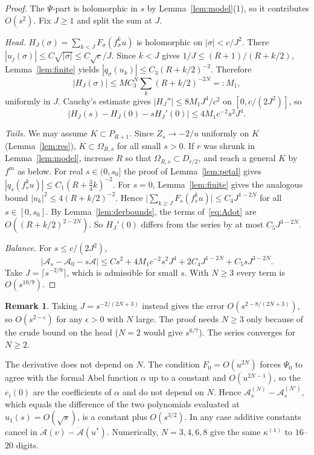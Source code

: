 \documentclass[11pt]{amsart}
\theoremstyle{definition}
\newtheorem{remark}[theorem]{Remark}
\begin{document}
\begin{proof}
The $\Psi$-part is holomorphic in $s$ by Lemma~\ref{lem:model}(1), so it
contributes $O(s^2)$.  Fix $J\ge1$ and split the sum at $J$.

\emph{Head.}  $H_J(\sigma)=\sum_{k<J}F_\sigma(f_\sigma^ku)$ is holomorphic on
$|\sigma|<c/J^2$.  There $|u_j(\sigma)|\le C\sqrt{|\sigma|}\le C\sqrt c/J$.
Since $k<J$ gives $1/J\le(R+1)/(R+k/2)$, Lemma~\ref{lem:finite} yields
$|q_\sigma(u_k)|\le C_3(R+k/2)^{-2}$.  Therefore
\[
 |H_J(\sigma)|\le MC_3^N\sum_k(R+k/2)^{-2N}=:M_1,
\]
uniformly in $J$.  Cauchy's estimate gives $|H_J''|\le8M_1J^4/c^2$ on
$[0,c/(2J^2)]$, so
\[
 |H_J(s)-H_J(0)-sH_J'(0)|\le4M_1c^{-2}s^2J^4 .
\]

\emph{Tails.}  We may assume $K\subset P_{R+1}$.  Since $Z_s\to-2/u$ uniformly
on $K$ (Lemma~\ref{lem:res}), $K\subset\Omega_{R,s}$ for all small $s>0$.  If $r$
was shrunk in Lemma~\ref{lem:model}, increase $R$ so that
$\Omega_{R,s}\subset D_{r/2}$, and reach a general $K$ by $f^m$ as below.  For
real $s\in(0,s_0]$ the proof of Lemma~\ref{lem:petal} gives
$|q_s(f_s^ku)|\le C_1(R+\tfrac34k)^{-2}$.  For $s=0$, Lemma~\ref{lem:finite}
gives the analogous bound $|u_k|^2\le4(R+k/2)^{-2}$.  Hence
$\bigl|\sum_{k\ge J}F_s(f_s^ku)\bigr|\le C_4J^{1-2N}$ for all $s\in[0,s_0]$.
By Lemma~\ref{lem:derbounds}, the terms of~\eqref{eq:Adot} are
$O((R+k/2)^{2-2N})$.  So $H_J'(0)$ differs from the series by at most
$C_5J^{3-2N}$.

\emph{Balance.}  For $s\le c/(2J^2)$,
\[
 \bigl|\mathcal A_s-\mathcal A_0-s\dot{\mathcal A}\bigr|
 \le Cs^2+4M_1c^{-2}s^2J^4+2C_4J^{1-2N}+C_5sJ^{3-2N}.
\]
Take $J=\lceil s^{-2/9}\rceil$, which is admissible for small $s$.  With
$N\ge3$ every term is $O(s^{10/9})$.
\end{proof}

\begin{remark}
Taking $J=s^{-2/(2N+3)}$ instead gives the error $O(s^{2-8/(2N+3)})$, so
$O(s^{2-\epsilon})$ for any $\epsilon>0$ with $N$ large.  The proof needs $N\ge3$
only because of the crude bound on the head ($N=2$ would give $s^{6/7}$).  The
series converges for $N\ge2$.

The derivative does not depend on $N$.  The condition $F_0=O(u^{2N})$ forces
$\Psi_0$ to agree with the formal Abel function $\alpha$ up to a constant and
$O(u^{2N-1})$, so the $e_i(0)$ are the coefficients of $\alpha$ and do not depend
on $N$.  Hence $\mathcal A^{(N)}_s-\mathcal A^{(N')}_s$, which equals the
difference of the two polynomials evaluated at $u_1(s)=O(\sqrt s)$, is a
constant plus $O(s^{3/2})$.  In any case additive constants cancel in
$\dot{\mathcal A}(v)-\dot{\mathcal A}(u^*)$.  Numerically, $N=3,4,6,8$ give the
same $\kappa^{(1)}$ to $16$--$20$ digits.
\end{remark}
\end{document}
